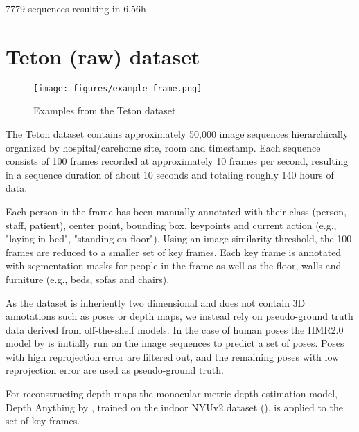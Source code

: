 7779 sequences resulting in 6.56h 



\section{Teton (raw) dataset}
\begin{figure}[H]
    \centering
    \texttt{[image: figures/example-frame.png]}
    \caption{Examples from the Teton dataset}
\end{figure}
The Teton dataset contains approximately 50,000 image sequences hierarchically organized by hospital/carehome site, room and timestamp. Each sequence consists of 100 frames recorded at approximately 10 frames per second, resulting in a sequence duration of about 10 seconds and totaling roughly 140 hours of data. 

Each person in the frame has been manually annotated with their class (person, staff, patient), center point, bounding box, keypoints and current action (e.g., "laying in bed", "standing on floor"). Using an image similarity threshold, the 100 frames are reduced to a smaller set of key frames. Each key frame is annotated with segmentation masks for people in the frame as well as the floor, walls and furniture (e.g., beds, sofas and chairs).

As the dataset is inheriently two dimensional and does not contain 3D annotations such as poses or depth maps, we instead rely on pseudo-ground truth data derived from off-the-shelf models. In the case of human poses the HMR2.0 model by \cite{goel2023humans} is initially run on the image sequences to predict a set of poses. Poses with high reprojection error are filtered out, and the remaining poses with low reprojection error are used as pseudo-ground truth. 

For reconstructing depth maps the monocular metric depth estimation model, Depth Anything by \cite{depthanything}, trained on the indoor NYUv2 dataset (\cite{SilbermanECCV12}), is applied to the set of key frames.





